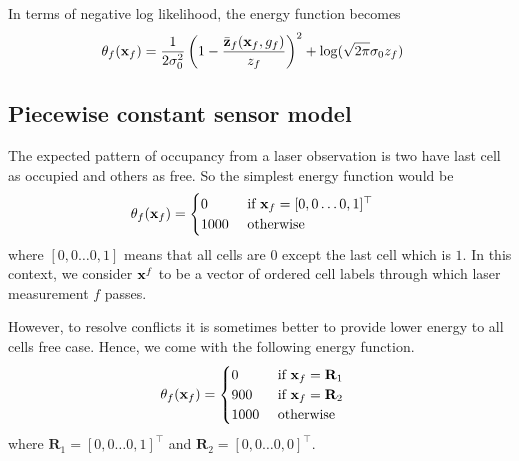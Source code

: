 \documentclass[letterpaper, 10 pt, conference]{ieeeconf} %
\newcommand{\vect}[1]{\mathbf{#1}}
\begin{document}
In terms of negative log likelihood, the energy function becomes
\begin{align}
  \theta_f(\map_f) &= \frac{1}{2\sigma_0^2}\left(1 -
  \frac{\actz}{\meas_f}\right)^2 + \log(\sqrt{2\pi}\sigma_0z_f)
\end{align}

\subsection{Piecewise constant sensor model}
The expected pattern of occupancy from a laser observation is two have last cell as occupied and others as free. So the simplest energy function would be 
\begin{align}
  \theta_f(\map_f) &= \begin{cases}
              0 & \text{ if } \map_f = [0, 0 \dots 0, 1]^\top\\
           1000 & \text{ otherwise}
  \end{cases}
\end{align}
where $[0, 0 \dots 0, 1]$ means that all cells are $0$ except the last cell which is $1$. In this context, we consider $\map^f$ to be a vector of ordered cell labels through which laser measurement $f$ passes.

However, to resolve conflicts it is sometimes better to provide lower energy to all cells free case. Hence, we come with the following energy function.
\begin{align}
  \theta_f(\map_f) &= \begin{cases}
                     0 & \text{ if } \map_f = \vect{R}_1\\
                   900 & \text{ if } \map_f = \vect{R}_2\\
                  1000 & \text{ otherwise}
  \end{cases}
  \label{eq:piecewiseconstant}
\end{align}
where $\vect{R}_1 = [0, 0 \dots 0, 1]^\top$ and $\vect{R}_2 = [0, 0 \dots 0, 0]^\top$.
\end{document}
